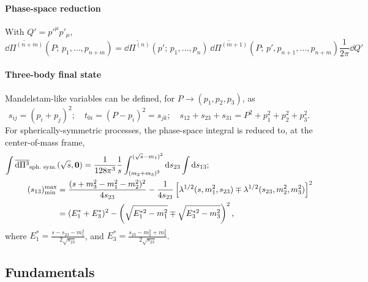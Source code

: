 \documentclass[CheatSheet]{subfiles}
\begin{document}
\paragraph{Phase-space reduction} With $Q'=p'^\mu p'_\mu$,
\begin{equation}
  \overline{\dd\Pi^{(n+m)}}(P;\,p_1,\dots,p_{n+m})
  =
  \overline{\dd\Pi^{(n)}}(p';\,p_1,\dots,p_n)\,
  \overline{\dd\Pi^{(m+1)}}(P;\,p',p_{n+1},\dots,p_{n+m})\frac{1}{2\pi}\dd Q'
  \label{eq:psreduction}
\end{equation}

\paragraph{Three-body final state} Mandelstam-like variables can be defined, for $P\to(p_1,p_2,p_3)$, as
\begin{equation*}
s_{ij}=(p_i+p_j)^2;\quad t_{0i}=(P-p_i)^2=s_{jk};\quad s_{12}+s_{23}+s_{31}=P^2+p_1^2+p_2^2+p_3^2.
\end{equation*}
For spherically-symmetric processes, the phase-space integral is reduced to, at the center-of-mass frame,
\begin{align}
\int\overline{\dd\Pi^3}_{\text{sph.\ sym.}}&(\sqrt{s}, \vc 0)
=\frac{1}{128\pi^3}\frac{1}{s}
\int_{(m_2+m_3)^2}^{(\sqrt{s}-m_1)^2}\dd s_{23}\int\dd s_{13};
\\ (s_{13})^{\text{max}}_{\text{min}} &=
\frac{(s+m_3^2-m_1^2-m_2^2)^2}{4s_{23}}
-\frac{1}{4s_{23}}
\left[\Kallen[1/2](s,m_1^2,s_{23})\mp\Kallen[1/2](s_{23},m_2^2,m_3^2)\right]^2
\notag\\&=(E_1^*+E_3^*)^2-\left(\sqrt{E_1^{*2}-m_1^2}\mp\sqrt{E_3^{*2}-m_3^2}\right)^2,
\quad
\end{align}
where 
$E_1^*=\frac{s-s_{23}-m_1^2}{2\sqrt{s_{23}}}$, and
$E_3^*=\frac{s_{23}-m_2^2+m_3^2}{2\sqrt{s_{23}}}$.

\newpage
\detailstyle
\subsection{Fundamentals}
\end{document}
